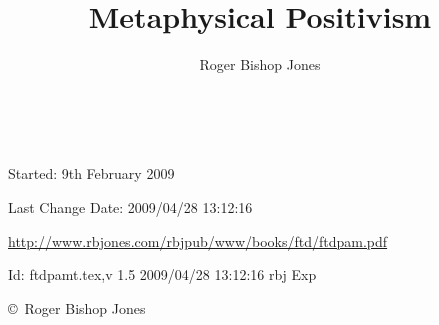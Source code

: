 \documentclass[10pt,a4paper.titlepage,openany,twocolumn]{article}
\author{Roger Bishop Jones}
\title{Metaphysical Positivism}
\date{\ }
\begin{document}
\begin{titlepage}
\maketitle
\begin{abstract}
\end{abstract}

\vfill

\begin{centering}

{\footnotesize

Started: 9th February 2009

Last Change $ $Date: 2009/04/28 13:12:16 $ $

\href{http://www.rbjones.com/rbjpub/www/books/ftd/ftdpam.pdf}
{http://www.rbjones.com/rbjpub/www/books/ftd/ftdpam.pdf}

$ $Id: ftdpamt.tex,v 1.5 2009/04/28 13:12:16 rbj Exp $ $

\copyright\ Roger Bishop Jones

}%

\end{centering}

\thispagestyle{empty}
\end{titlepage}

\onecolumn

{\parskip=0pt\tableofcontents}

\vfill

\pagebreak

\twocolumn
\end{document}
